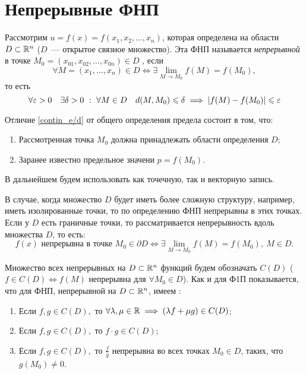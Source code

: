 \documentclass[../../main.tex]{subfiles}
\begin{document}
	
	\section{Непрерывные ФНП}	
	
	Рассмотрим $u = f(x) = f(x_1, x_2, \ldots, x_n)$, которая 
	определена на области
	$D \subset \mathbb{R}^n$ ($D$~--- открытое связное множество). Эта ФНП называется
	\emph{непрерывной} в точке $M_0 = (x_{01}, x_{02}, \ldots, x_{0n}) \in D$
	, если
	\begin{equation}
	\label{continuity}
	\forall M = (x_1, \ldots, x_n) \in D \iff \exists 
	\lim\limits_{M \to M_0}f(M) = f(M_0),
	\end{equation}
	то есть
	\begin{equation}
	\label{contin_e/d}
	\forall \eps > 0 \quad \exists \delta > 0 \ : \ 
	\forall M \in D \quad
	d(M, M_0) \leq \delta \implies |f(M) - f(M_0)| \leq \eps
	\end{equation}
	
	Отличие \eqref{contin_e/d} от общего определения 
	предела состоит в том, что:
	\begin{enumerate}
		\item  Рассмотренная точка $M_0$ должна принадлежать области 
		       определения $D$;
		\item Заранее известно предельное значени $p = f(M_0)$.
	\end{enumerate}
	
    В дальнейшем будем использовать как точечную, так и векторную запись.
    
    В случае, когда множество $D$ будет иметь более сложную структуру, 
    например, иметь изолированные точки, то по определению ФНП 
    непрерывны в этих
    точках. Если у $D$ есть граничные точки, то рассматривается непрерывность 
    вдоль множества $D$, то есть:
    \[
      f(x) \text{ непрерывна в точке } M_0 \in \partial D 
      \iff \exists \lim\limits_{M \to M_0}
       f(M) = f(M_0), \ M \in D.
    \]
    
    Множество всех непрерывных на $D \subset \mathbb{R}^n$ 
    функций будем обозначать $C(D)$ 
    ($f \in C(D) \iff f(M)$ непрерывна для $\forall M_0 \in D$). Как и для Ф1П 
    показывается, что для ФНП, непрерывной на $D \subset \mathbb{R}^n$, имеем :
    \begin{enumerate}
    	\item Если $f, g \in C(D),$ то $\forall \lambda, \mu \in \mathbb{R} \implies 
    	      (\lambda f + \mu g) \in C(D)$;
    	\item Если $f, g \in C(D),$ то $f \cdot g \in C(D)$;
    	\item Если $f, g \in C(D),$ то $\frac{f}{g}$ непрерывна  во всех точках 
        $M_0 \in D$, таких, что  $g(M_0) \ne 0$.
    \end{enumerate}
    
\end{document}
